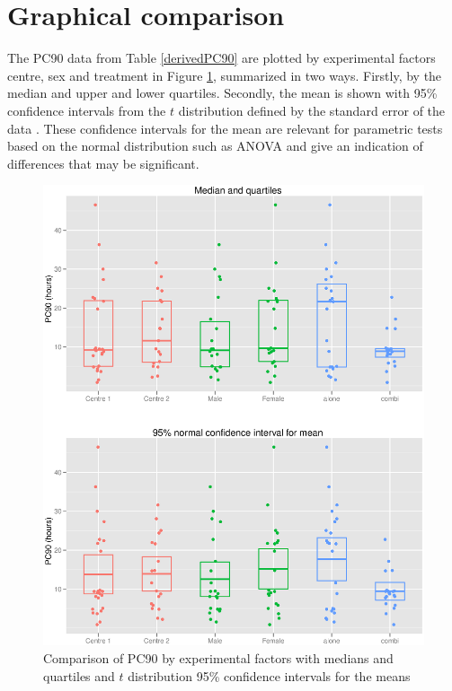 \section{Graphical comparison}
The PC90 data from Table \ref{derivedPC90} are plotted by experimental factors centre, sex and treatment in Figure \ref{pc90boxes}, summarized in two ways. Firstly, by the median and upper and lower quartiles. Secondly, the mean is shown with 95\% confidence intervals from the $t$ distribution defined by the standard error of the data%
. These confidence intervals for the mean are relevant for parametric tests based on the normal distribution such as ANOVA and give an indication of differences that may be significant.
\begin{figure}[p]
\includegraphics[width=6.5in]{pc90boxes.eps} 
\caption{Comparison of PC90 by experimental factors with medians and quartiles and $t$ distribution 95\% confidence intervals for the means}
\label{pc90boxes}
\end{figure}

